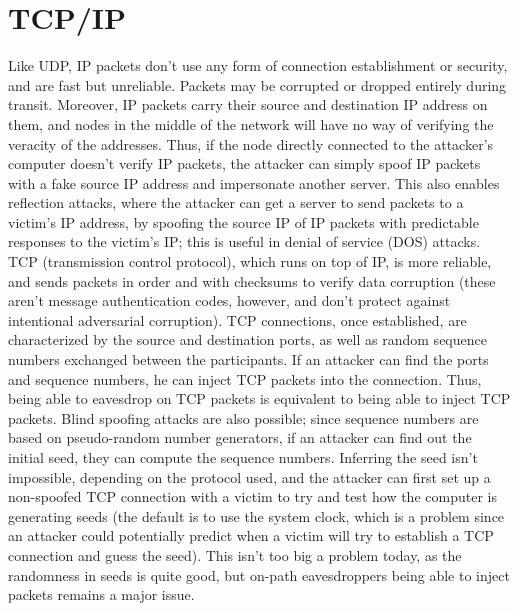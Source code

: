 \documentclass{article}
\begin{document}
\section{TCP/IP}
Like UDP, IP packets don't use any form of connection establishment or security, and are fast but unreliable. Packets may be corrupted or dropped entirely during transit. Moreover, IP packets carry their source and destination IP address on them, and nodes in the middle of the network will have no way of verifying the veracity of the addresses. Thus, if the node directly connected to the attacker's computer doesn't verify IP packets, the attacker can simply spoof IP packets with a fake source IP address and impersonate another server. This also enables reflection attacks, where the attacker can get a server to send packets to a victim's IP address, by spoofing the source IP of IP packets with predictable responses to the victim's IP; this is useful in denial of service (DOS) attacks.
\newline \newline
TCP (transmission control protocol), which runs on top of IP, is more reliable, and sends packets in order and with checksums to verify data corruption (these aren't message authentication codes, however, and don't protect against intentional adversarial corruption). TCP connections, once established, are characterized by the source and destination ports, as well as random sequence numbers exchanged between the participants. If an attacker can find the ports and sequence numbers, he can inject TCP packets into the connection. Thus, being able to eavesdrop on TCP packets is equivalent to being able to inject TCP packets. Blind spoofing attacks are also possible; since sequence numbers are based on pseudo-random number generators, if an attacker can find out the initial seed, they can compute the sequence numbers. Inferring the seed isn't impossible, depending on the protocol used, and the attacker can first set up a non-spoofed TCP connection with a victim to try and test how the computer is generating seeds (the default is to use the system clock, which is a problem since an attacker could potentially predict when a victim will try to establish a TCP connection and guess the seed). This isn't too big a problem today, as the randomness in seeds is quite good, but on-path eavesdroppers being able to inject packets remains a major issue.
\newline \newline
\end{document}

